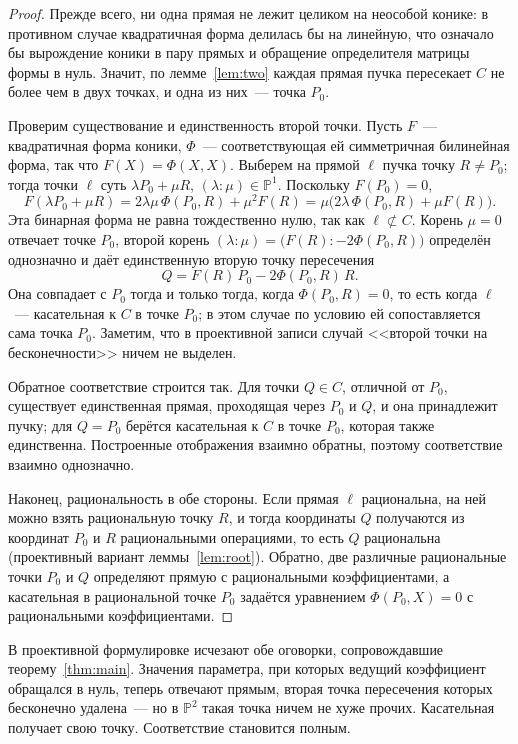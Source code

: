 \documentclass[a4paper,14pt]{extreport}
\theoremstyle{definition}
\newcommand{\PP}{\mathbb{P}}
\begin{document}
\begin{proof}
Прежде всего, ни одна прямая не лежит целиком на неособой конике: в противном
случае квадратичная форма делилась бы на линейную, что означало бы вырождение
коники в пару прямых и обращение определителя матрицы формы в нуль. Значит, по
лемме~\ref{lem:two} каждая прямая пучка пересекает $C$ не более чем в двух
точках, и одна из них~--- точка $P_0$.

Проверим существование и единственность второй точки. Пусть $F$~--- квадратичная
форма коники, $\Phi$~--- соответствующая ей симметричная билинейная форма, так
что $F(X)=\Phi(X,X)$. Выберем на прямой $\ell$ пучка точку $R\neq P_0$; тогда
точки $\ell$ суть $\lambda P_0+\mu R$, $(\lambda:\mu)\in\PP^1$. Поскольку
$F(P_0)=0$,
\[
  F(\lambda P_0+\mu R)=2\lambda\mu\,\Phi(P_0,R)+\mu^2F(R)
  =\mu\bigl(2\lambda\,\Phi(P_0,R)+\mu F(R)\bigr).
\]
Эта бинарная форма не равна тождественно нулю, так как $\ell\not\subset C$.
Корень $\mu=0$ отвечает точке $P_0$, второй корень
$(\lambda:\mu)=\bigl(F(R):-2\Phi(P_0,R)\bigr)$ определён однозначно и даёт
единственную вторую точку пересечения
\[
  Q=F(R)\,P_0-2\Phi(P_0,R)\,R .
\]
Она совпадает с $P_0$ тогда и только тогда, когда $\Phi(P_0,R)=0$, то есть
когда $\ell$~--- касательная к $C$ в точке $P_0$; в этом случае по условию ей
сопоставляется сама точка $P_0$. Заметим, что в проективной записи случай
<<второй точки на бесконечности>> ничем не выделен.

Обратное соответствие строится так. Для точки $Q\in C$, отличной от $P_0$,
существует единственная прямая, проходящая через $P_0$ и $Q$, и она принадлежит
пучку; для $Q=P_0$ берётся касательная к $C$ в точке $P_0$, которая также
единственна. Построенные отображения взаимно обратны, поэтому соответствие
взаимно однозначно.

Наконец, рациональность в обе стороны. Если прямая $\ell$ рациональна, на ней
можно взять рациональную точку $R$, и тогда координаты $Q$ получаются из
координат $P_0$ и $R$ рациональными операциями, то есть $Q$ рациональна
(проективный вариант леммы~\ref{lem:root}). Обратно, две различные
рациональные точки $P_0$ и $Q$ определяют прямую с рациональными
коэффициентами, а касательная в рациональной точке $P_0$ задаётся уравнением
$\Phi(P_0,X)=0$ с рациональными коэффициентами.
\end{proof}

В проективной формулировке исчезают обе оговорки, сопровождавшие
теорему~\ref{thm:main}. Значения параметра, при которых ведущий коэффициент
обращался в нуль, теперь отвечают прямым, вторая точка пересечения которых
бесконечно удалена~--- но в $\PP^2$ такая точка ничем не хуже прочих.
Касательная получает свою точку. Соответствие становится полным.
\end{document}
